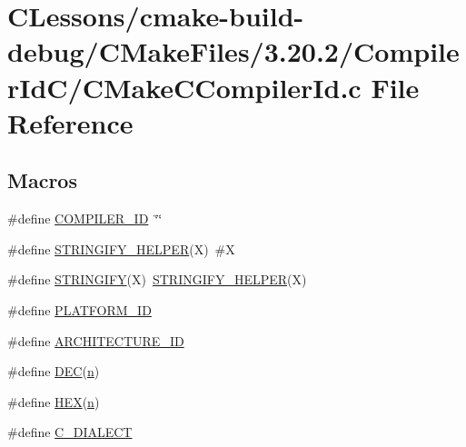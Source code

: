 \hypertarget{_c_lessons_2cmake-build-debug_2_c_make_files_23_820_82_2_compiler_id_c_2_c_make_c_compiler_id_8c}{}\section{C\+Lessons/cmake-\/build-\/debug/\+C\+Make\+Files/3.20.2/\+Compiler\+Id\+C/\+C\+Make\+C\+Compiler\+Id.c File Reference}
\label{_c_lessons_2cmake-build-debug_2_c_make_files_23_820_82_2_compiler_id_c_2_c_make_c_compiler_id_8c}
\subsection*{Macros}
\begin{DoxyCompactItemize}
\item 
\#define \hyperlink{_c_lessons_2cmake-build-debug_2_c_make_files_23_820_82_2_compiler_id_c_2_c_make_c_compiler_id_8c_a81dee0709ded976b2e0319239f72d174}{C\+O\+M\+P\+I\+L\+E\+R\+\_\+\+I\+D}~\char`\"{}\char`\"{}
\item 
\#define \hyperlink{_c_lessons_2cmake-build-debug_2_c_make_files_23_820_82_2_compiler_id_c_2_c_make_c_compiler_id_8c_a2ae9b72bb13abaabfcf2ee0ba7d3fa1d}{S\+T\+R\+I\+N\+G\+I\+F\+Y\+\_\+\+H\+E\+L\+P\+E\+R}(X)~\#X
\item 
\#define \hyperlink{_c_lessons_2cmake-build-debug_2_c_make_files_23_820_82_2_compiler_id_c_2_c_make_c_compiler_id_8c_a43e1cad902b6477bec893cb6430bd6c8}{S\+T\+R\+I\+N\+G\+I\+F\+Y}(X)~\hyperlink{cmake-build-debug_2_c_make_files_23_820_82_2_compiler_id_c_2_c_make_c_compiler_id_8c_a2ae9b72bb13abaabfcf2ee0ba7d3fa1d}{S\+T\+R\+I\+N\+G\+I\+F\+Y\+\_\+\+H\+E\+L\+P\+E\+R}(X)
\item 
\#define \hyperlink{_c_lessons_2cmake-build-debug_2_c_make_files_23_820_82_2_compiler_id_c_2_c_make_c_compiler_id_8c_adbc5372f40838899018fadbc89bd588b}{P\+L\+A\+T\+F\+O\+R\+M\+\_\+\+I\+D}
\item 
\#define \hyperlink{_c_lessons_2cmake-build-debug_2_c_make_files_23_820_82_2_compiler_id_c_2_c_make_c_compiler_id_8c_aba35d0d200deaeb06aee95ca297acb28}{A\+R\+C\+H\+I\+T\+E\+C\+T\+U\+R\+E\+\_\+\+I\+D}
\item 
\#define \hyperlink{_c_lessons_2cmake-build-debug_2_c_make_files_23_820_82_2_compiler_id_c_2_c_make_c_compiler_id_8c_ad1280362da42492bbc11aa78cbf776ad}{D\+E\+C}(\hyperlink{lesson3_8c_acfc02ec89670db29251fda6a66602ce2}{n})
\item 
\#define \hyperlink{_c_lessons_2cmake-build-debug_2_c_make_files_23_820_82_2_compiler_id_c_2_c_make_c_compiler_id_8c_a46d5d95daa1bef867bd0179594310ed5}{H\+E\+X}(\hyperlink{lesson3_8c_acfc02ec89670db29251fda6a66602ce2}{n})
\item 
\#define \hyperlink{_c_lessons_2cmake-build-debug_2_c_make_files_23_820_82_2_compiler_id_c_2_c_make_c_compiler_id_8c_a07f8e5783674099cd7f5110e22a78cdb}{C\+\_\+\+D\+I\+A\+L\+E\+C\+T}
\end{DoxyCompactItemize}
